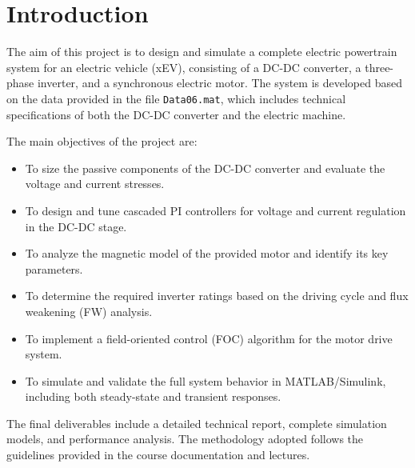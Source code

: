 \section{Introduction}

The aim of this project is to design and simulate a complete electric powertrain system for an electric vehicle (xEV), consisting of a DC-DC converter, a three-phase inverter, and a synchronous electric motor. The system is developed based on the data provided in the file \texttt{Data06.mat}, which includes technical specifications of both the DC-DC converter and the electric machine.

The main objectives of the project are:
\begin{itemize}
  \item To size the passive components of the DC-DC converter and evaluate the voltage and current stresses.
  \item To design and tune cascaded PI controllers for voltage and current regulation in the DC-DC stage.
  \item To analyze the magnetic model of the provided motor and identify its key parameters.
  \item To determine the required inverter ratings based on the driving cycle and flux weakening (FW) analysis.
  \item To implement a field-oriented control (FOC) algorithm for the motor drive system.
  \item To simulate and validate the full system behavior in MATLAB/Simulink, including both steady-state and transient responses.
\end{itemize}

The final deliverables include a detailed technical report, complete simulation models, and performance analysis. The methodology adopted follows the guidelines provided in the course documentation and lectures.
